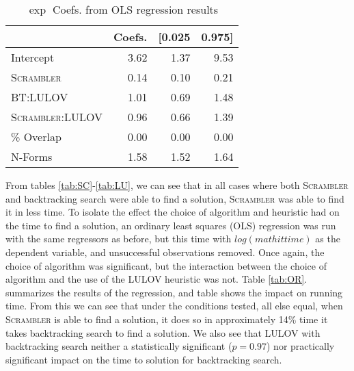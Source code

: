 \documentclass[11pt]{article}
\begin{document}
\begin{table}
  \centering
  \begin{tabular}{lrrr}
    \toprule[1.5pt]
    {} &  Coefs. &  [0.025 &  0.975] \\
    \midrule
    Intercept                          &    3.62 &    1.37 &    9.53 \\
    \textsc{Scrambler}                 &    0.14 &    0.10 &    0.21 \\
    BT:LULOV       &    1.01 &    0.69 &    1.48 \\
    \textsc{Scrambler}:LULOV &    0.96 &    0.66 &    1.39 \\
    \% Overlap                    &    0.00 &    0.00 &    0.00 \\
    N-Forms                             &    1.58 &    1.52 &    1.64 \\
    \bottomrule[1.2pt]

  \end{tabular}
  \caption{\(\exp\) Coefs. from OLS regression results}\label{tab:OE}
\end{table}

From tables \ref{tab:SC}-\ref{tab:LU}, we can see that in all cases
where both \textsc{Scrambler} and backtracking search were able to
find a solution, \textsc{Scrambler} was able to find it in less time.
To isolate the effect the choice of algorithm and heuristic had on the
time to find a solution, an ordinary least squares (OLS) regression
was run with the same regressors as before, but this time with
\(log(mathit{time})\)
as the dependent variable, and unsuccessful observations removed.
Once again, the choice of algorithm was significant, but the
interaction between the choice of algorithm and the use of the LULOV
heuristic was not. Table \ref{tab:OR}. summarizes the results of the
regression, and table shows the impact on running time.  From this we
can see that under the conditions tested, all else equal, when
\textsc{Scrambler} is able to find a solution, it does so in
approximately 14\% time it takes backtracking search to find a
solution.  We also see that LULOV with backtracking search neither a
statistically significant (\(p=0.97\))
nor practically significant impact on the time to solution for
backtracking search.
\end{document}
